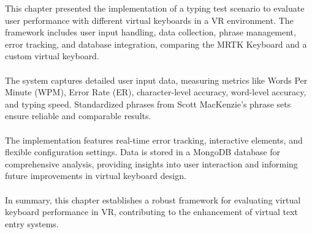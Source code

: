 This chapter presented the implementation of a typing test scenario to evaluate user performance with different virtual keyboards in a VR environment. The framework includes user input handling, data collection, phrase management, error tracking, and database integration, comparing the MRTK Keyboard and a custom virtual keyboard.\\ \\
The system captures detailed user input data, measuring metrics like Words Per Minute (WPM), Error Rate (ER), character-level accuracy, word-level accuracy, and typing speed. Standardized phrases from Scott MacKenzie's phrase sets ensure reliable and comparable results.\\ \\
The implementation features real-time error tracking, interactive elements, and flexible configuration settings. Data is stored in a MongoDB database for comprehensive analysis, providing insights into user interaction and informing future improvements in virtual keyboard design.\\ \\
In summary, this chapter establishes a robust framework for evaluating virtual keyboard performance in VR, contributing to the enhancement of virtual text entry systems.